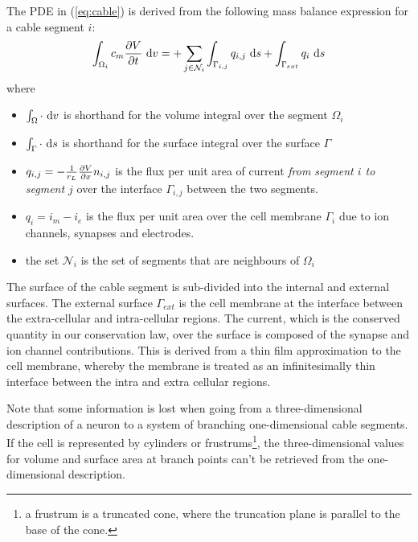 The PDE in (\ref{eq:cable}) is derived from the following mass balance expression for a cable segment $i$:
\begin{equation}
    \int_{\Omega_i}{c_m \frac{\partial{V}}{\partial{t}} } ~\text{d}{v} =
        + \sum_{j\in\mathcal{N}_i} {\int_{\Gamma_{i,j}} q_{i,j} ~\text{d}{s} }
        + \int_{\Gamma_{ext}} {q_i} ~\text{d}{s}
    \label{eq:cable_balance}
\end{equation}
where
\begin{itemize}
    \item $\int_\Omega \cdot ~\text{d}{v}$ is shorthand for the volume integral over the segment $\Omega_i$
    \item $\int_\Gamma \cdot ~\text{d}{s}$ is shorthand for the surface integral over the surface $\Gamma$
    \item $q_{i,j}=-\frac{1}{r_L}\frac{\partial{V}}{\partial{x}} n_{i,j}$ is the flux per unit area of current \emph{from segment $i$ to segment $j$} over the interface $\Gamma_{i,j}$ between the two segments.
    \item $q_i=i_m - i_e$ is the flux per unit area over the cell membrane $\Gamma_i$ due to ion channels, synapses and electrodes.
    \item the set $\mathcal{N}_i$ is the set of segments that are neighbours of $\Omega_i$
\end{itemize}

The surface of the cable segment is sub-divided into the internal and external surfaces.
The external surface $\Gamma_{ext}$ is the cell membrane at the interface between the extra-cellular and intra-cellular regions.
The current, which is the conserved quantity in our conservation law, over the surface is composed of the synapse and ion channel contributions.
This is derived from a thin film approximation to the cell membrane, whereby the membrane is treated as an infinitesimally thin interface between the intra and extra cellular regions.

Note that some information is lost when going from a three-dimensional description of a neuron to a system of branching one-dimensional cable segments.
If the cell is represented by cylinders or frustrums\footnote{a frustrum is a truncated cone, where the truncation plane is parallel to the base of the cone.}, the three-dimensional values for volume and surface area at branch points can't be retrieved from the one-dimensional description.

